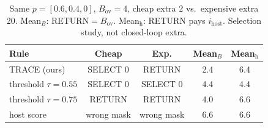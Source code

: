 \begin{table}[t]
\centering
\caption{Same $p{=}[0.6,0.4,0]$, $B_{\mathrm{ov}}{=}4$, cheap extra $2$ vs.\ expensive extra $20$.
Mean$_{B}$: RETURN${=}B_{\mathrm{ov}}$. Mean$_{\mathrm{h}}$: RETURN pays $i_{\mathrm{host}}$.
Selection study, not closed-loop extra.}
\label{tab:rules}
\scriptsize
\setlength{\tabcolsep}{3pt}
\begin{tabular}{lcccc}
\toprule
Rule & Cheap & Exp. & Mean$_{B}$ & Mean$_{\mathrm{h}}$ \\
\midrule
TRACE (ours) & SELECT $0$ & RETURN & 2.4 & 6.4 \\
threshold $\tau{=}0.55$ & SELECT $0$ & SELECT $0$ & 4.4 & 4.4 \\
threshold $\tau{=}0.75$ & RETURN & RETURN & 4.0 & 6.6 \\
host score & wrong mask & wrong mask & 6.6 & 6.6 \\
\bottomrule
\end{tabular}
\end{table}
